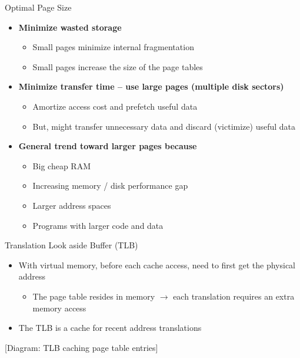 \documentclass[aspectratio=169,12pt]{beamer}
\begin{document}
\begin{frame}{Optimal Page Size}
\begin{itemize}
\item \textbf{Minimize wasted storage}
    \begin{itemize}
    \item Small pages minimize internal fragmentation
    \item Small pages increase the size of the page tables
    \end{itemize}
\item \textbf{Minimize transfer time – use large pages (multiple disk sectors)}
    \begin{itemize}
    \item Amortize access cost and prefetch useful data
    \item But, might transfer unnecessary data and discard (victimize) useful data
    \end{itemize}
\item \textbf{General trend toward larger pages because}
    \begin{itemize}
    \item Big cheap RAM
    \item Increasing memory / disk performance gap
    \item Larger address spaces
    \item Programs with larger code and data
    \end{itemize}
\end{itemize}
\end{frame}

\begin{frame}{Translation Look aside Buffer (TLB)}
\begin{itemize}
\item With virtual memory, before each cache access, need to first get the physical address
    \begin{itemize}
    \item The page table resides in memory $\rightarrow$ each translation requires an extra memory access
    \end{itemize}
\item The TLB is a cache for recent address translations
\end{itemize}
\begin{center}
[Diagram: TLB caching page table entries]
\end{center}
\end{frame}
\end{document}
